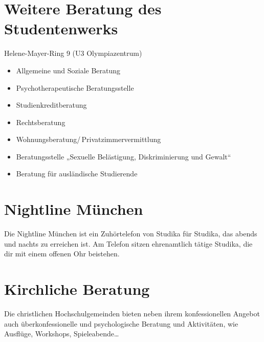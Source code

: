 \begin{urlList}
\end{urlList}


\section{Weitere Beratung des Studentenwerks}
Helene-Mayer-Ring 9 (U3 Olympiazentrum)

\begin{itemize}
	\item Allgemeine und Soziale Beratung
	\item Psychotherapeutische Beratungsstelle
	\item Studienkreditberatung
	\item Rechtsberatung
	\item Wohnungsberatung/\,Privatzimmervermittlung
	\item Beratungsstelle „Sexuelle Belästigung, Diskriminierung und Gewalt“
	\item Beratung für ausländische Studierende
\end{itemize}

\begin{urlList}
\end{urlList}


\section{Nightline München}

Die Nightline München ist ein Zuhörtelefon von Studika für Studika,
das abends und nachts zu erreichen ist. Am Telefon sitzen ehrenamtlich
tätige Studika, die dir mit einem offenen Ohr beistehen.

\begin{urlList}
\end{urlList}


\section{Kirchliche Beratung}
Die christlichen Hochschulgemeinden bieten neben ihrem konfessionellen Angebot auch überkonfessionelle und psychologische Beratung und Aktivitäten, wie Ausflüge, Workshops, Spieleabende\ldots

\begin{urlList}
\end{urlList}
